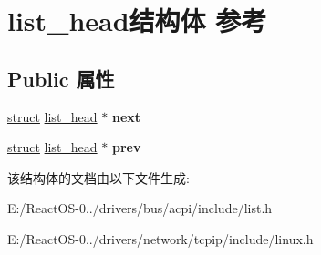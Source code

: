 \hypertarget{structlist__head}{}\section{list\+\_\+head结构体 参考}
\label{structlist__head}
\subsection*{Public 属性}
\begin{DoxyCompactItemize}
\item 
\mbox{\label{structlist__head_a44b2d28c78f7266869b3f00390bec772}} 
\hyperlink{interfacestruct}{struct} \hyperlink{structlist__head}{list\+\_\+head} $\ast$ {\bfseries next}
\item 
\mbox{\label{structlist__head_aaa0eabda8877e1d6de73a33f223ad004}} 
\hyperlink{interfacestruct}{struct} \hyperlink{structlist__head}{list\+\_\+head} $\ast$ {\bfseries prev}
\end{DoxyCompactItemize}


该结构体的文档由以下文件生成\+:\begin{DoxyCompactItemize}
\item 
E\+:/\+React\+O\+S-\/0../drivers/bus/acpi/include/list.\+h\item 
E\+:/\+React\+O\+S-\/0../drivers/network/tcpip/include/linux.\+h\end{DoxyCompactItemize}
